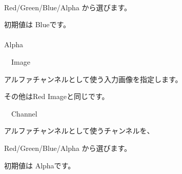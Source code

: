 \documentclass[a4paper,12pt]{article}
\begin{document}
\newpage

\thispagestyle{empty}

\ \vspace{-0.2em}
\par
Red/Green/Blue/Alpha から選びます。\par
初期値は Blueです。\\
\\
Alpha\par
\noindent \ \, Image\par
アルファチャンネルとして使う入力画像を指定します。\par
その他は\textquotedbl Red Image\textquotedbl と同じです。\\
\par
\noindent \ \, Channel\par
アルファチャンネルとして使うチャンネルを、\par
Red/Green/Blue/Alpha から選びます。\par
初期値は Alphaです。
\end{document}
